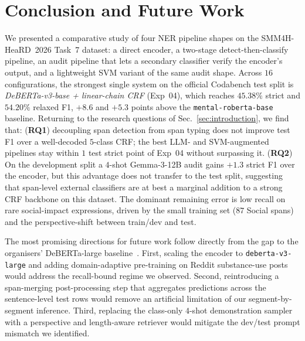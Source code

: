 \documentclass[journal]{IEEEtran}
\begin{document}




\section{Conclusion and Future Work}
\label{sec:conclusion}

We presented a comparative study of four NER pipeline shapes on the
SMM4H-HeaRD~2026 Task~7 dataset: a direct encoder, a two-stage
detect-then-classify pipeline, an audit pipeline that lets a
secondary classifier verify the encoder's output, and a lightweight
SVM variant of the same audit shape. Across $16$ configurations, the
strongest single system on the official Codabench test split is
\emph{DeBERTa-v3-base + linear-chain CRF} (Exp~04), which reaches
$45.38\%$ strict and $54.20\%$ relaxed F1, $+8.6$ and $+5.3$ points
above the \texttt{mental-roberta-base} baseline. Returning to the
research questions of Sec.~\ref{sec:introduction}, we find that:
(\textbf{RQ1}) decoupling span detection from span typing does not
improve test F1 over a well-decoded $5$-class CRF; the best LLM- and
SVM-augmented pipelines stay within $1$ test strict point of Exp~04
without surpassing it. (\textbf{RQ2}) On the development split a
$4$-shot Gemma-3-12B audit gains $+1.3$ strict F1 over the encoder,
but this advantage does not transfer to the test split, suggesting
that span-level external classifiers are at best a marginal addition
to a strong CRF backbone on this dataset. The dominant remaining
error is low recall on rare social-impact expressions, driven by the
small training set ($87$ Social spans) and the perspective-shift
between train/dev and test.

The most promising directions for future work follow directly from
the gap to the organisers'
DeBERTa-large baseline~\cite{dey2025inference}. First, scaling the
encoder to \texttt{deberta-v3-large} and adding domain-adaptive
pre-training on Reddit substance-use posts would address the
recall-bound regime we observed. Second, reintroducing a span-merging
post-processing step that aggregates predictions across the
sentence-level test rows would remove an artificial limitation of
our segment-by-segment inference. Third, replacing the class-only
$4$-shot demonstration sampler with a perspective and length-aware
retriever would mitigate the dev/test prompt mismatch we identified.
\end{document}
